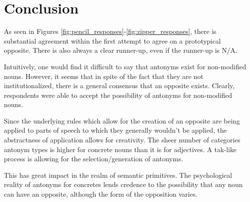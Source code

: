 \section {Conclusion}
As seen in Figures \ref{fig:pencil_responses}-\ref{fig:zipper_responses}, there is substantial agreement within the first attempt to agree on a prototypical opposite.  There is also always a clear runner-up, even if the runner-up is N/A.  

Intuitively, one would find it difficult to say that antonyms exist for non-modified nouns.  However, it seems that in spite of the fact that they are not institutionalized, there is a general consensus that an opposite exists.  Clearly, respondents were able to accept the possibility of antonyms for non-modified nouns. 

Since the underlying rules which allow for the creation of an opposite are being applied to parts of speech to which they generally wouldn’t be applied, the abstractness of application allows for creativity.  The sheer number of categories antonym types is higher for concrete nouns than it is for adjectives.  A tak-like process is allowing for the selection/generation of antonyms.

This has great impact in the realm of semantic primitives.  The psychological reality of antonyms for concretes lends credence to the possibility that any noun can have an opposite, although the form of the opposition varies.

